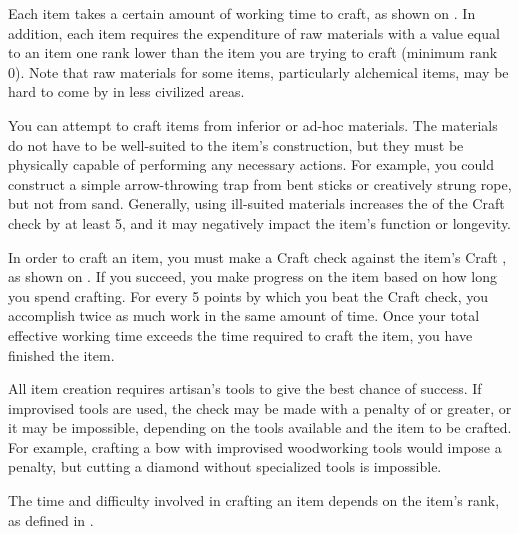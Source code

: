         Each item takes a certain amount of working time to craft, as shown on .
        In addition, each item requires the expenditure of raw materials with a value equal to an item one rank lower than the item you are trying to craft (minimum rank 0).
        Note that raw materials for some items, particularly alchemical items, may be hard to come by in less civilized areas.

        You can attempt to craft items from inferior or ad-hoc materials.
        The materials do not have to be well-suited to the item's construction, but they must be physically capable of performing any necessary actions.
        For example, you could construct a simple arrow-throwing trap from bent sticks or creatively strung rope, but not from sand.
        Generally, using ill-suited materials increases the  of the Craft check by at least 5, and it may negatively impact the item's function or longevity.

        In order to craft an item, you must make a Craft check against the item's Craft , as shown on .
        If you succeed, you make progress on the item based on how long you spend crafting.
        For every 5 points by which you beat the Craft check, you accomplish twice as much work in the same amount of time.
        Once your total effective working time exceeds the time required to craft the item, you have finished the item.

        All item creation requires artisan's tools to give the best chance of success. If improvised tools are used, the check may be made with a penalty of  or greater, or it may be impossible, depending on the tools available and the item to be crafted. For example, crafting a bow with improvised woodworking tools would impose a  penalty, but cutting a diamond without specialized tools is impossible.

        The time and difficulty involved in crafting an item depends on the item's rank, as defined in .

